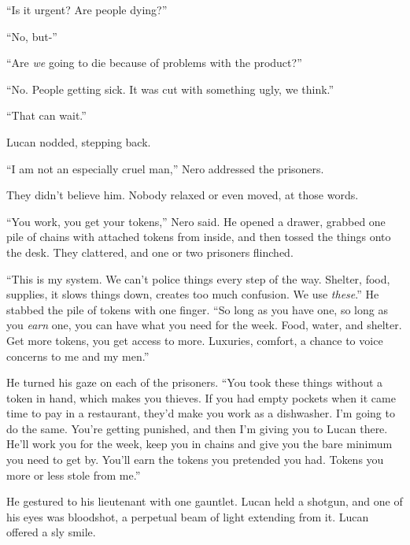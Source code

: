 ``Is it urgent?  Are people dying?''



``No, but-''



``Are \emph{we} going to die because of problems with the product?''



``No.  People getting sick.  It was cut with something ugly, we think.''



``That can wait.''



Lucan nodded, stepping back.



``I am not an especially cruel man,'' Nero addressed the prisoners.



They didn't believe him.  Nobody relaxed or even moved, at those words.



``You work, you get your tokens,'' Nero said.  He opened a drawer, grabbed one pile of chains with attached tokens from inside, and then tossed the things onto the desk.  They clattered, and one or two prisoners flinched.



``This is my system.  We can't police things every step of the way.  Shelter, food, supplies, it slows things down, creates too much confusion.  We use \emph{these}.''  He stabbed the pile of tokens with one finger.  ``So long as you have one, so long as you \emph{earn} one, you can have what you need for the week.  Food, water, and shelter.  Get more tokens, you get access to more.  Luxuries, comfort, a chance to voice concerns to me and my men.''



He turned his gaze on each of the prisoners.  ``You took these things without a token in hand, which makes you thieves.  If you had empty pockets when it came time to pay in a restaurant, they'd make you work as a dishwasher.  I'm going to do the same.  You're getting punished, and then I'm giving you to Lucan there.  He'll work you for the week, keep you in chains and give you the bare minimum you need to get by.  You'll earn the tokens you pretended you had.  Tokens you more or less stole from me.''



He gestured to his lieutenant with one gauntlet.  Lucan held a shotgun, and one of his eyes was bloodshot, a perpetual beam of light extending from it.  Lucan offered a sly smile.



